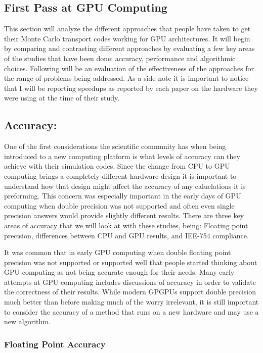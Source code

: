 \subsection{ \textbf{First Pass at GPU Computing}}

This section will analyze the different approaches that people have taken to get their Monte Carlo transport codes working for GPU architectures.
%
It will begin by comparing and contrasting different approaches by evaluating a few key areas of the studies that have been done: accuracy, performance and algorithmic choices.
%
Following will be an evaluation of the effectiveness of the approaches for the range of problems being addressed.
%
As a side note it is important to notice that I will be reporting speedups as reported by each paper on the hardware they were using at the time of their study.

\subsection*{ \textbf{Accuracy:} }

One of the first considerations the scientific community has when being introduced to a new computing platform is what levels of accuracy can they achieve with their simulation codes.
%
Since the change from CPU to GPU computing brings a completely different hardware design it is important to understand how that design might affect the accuracy of any caluclations it is preforming.
%
This concern was especially important in the early days of GPU computing when double precision was not supported and often even single precision answers would provide slightly different results.
%
There are three key areas of accuracy that we will look at with these studies, being: Floating point precision, differences between CPU and GPU results, and IEE-754 compliance.
%

%
It was common that in early GPU computing when double floating point precision was not supported or supported well that people started thinking about GPU computing as not being accurate enough for their needs.
%
Many early attempts at GPU computing includes discussions of accuracy in order to validate the correctness of their results.
%
While modern GPGPUs support double precision much better than before making much of the worry irrelevant, it is still important to consider the accuracy of a method that runs on a new hardware and may use a new algorithm.
%

\subsubsection*{\textbf{Floating Point Accuracy} }


